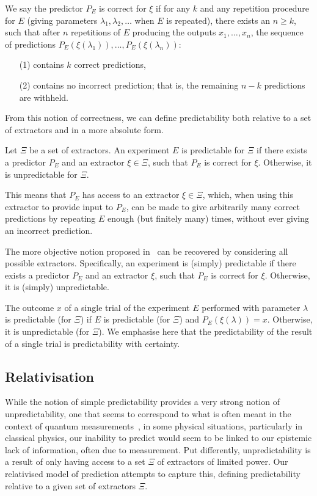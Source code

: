 \documentclass[information,article,accept,moreauthors,pdftex,12pt,a4paper]{mdpi}
\theoremstyle{mdpi}
\newcounter{ex}
\newcounter{re}
\theoremstyle{mdpidefinition}
\begin{document}
We say the predictor $P_E$ is correct for $\xi$ if for any $k$ and any repetition procedure for $E$ (giving parameters $\lambda_1, \lambda_2, \dots$ when $E$ is repeated), there exists an $n\ge k$, such that after $n$ repetitions of $E$ producing the outputs $x_1,\dots,x_n$, the sequence of predictions $P_E(\xi(\lambda_1)),\dots,P_E(\xi(\lambda_n))$:
\begin{enumerate}
	\item[(1)] contains $k$ correct predictions,
	\item[(2)] contains no incorrect prediction; that is, the remaining $n-k$ predictions are withheld.
\end{enumerate}


From this notion of correctness, we can define predictability both relative to a set of extractors and in a more absolute form.

Let $\Xi$ be a set of extractors.
An experiment $E$ is {predictable for $\Xi$} if there exists a predictor $P_E$ and an extractor $\xi\in\Xi$, such that $P_E$ is correct for $\xi$.
Otherwise, it is {unpredictable for $\Xi$}.

This means that $P_E$ has access to an extractor $\xi\in\Xi$, which, when using this extractor to provide input to $P_E$, can be made to give arbitrarily many correct predictions by repeating $E$ enough (but finitely many) times, without ever giving an incorrect prediction.

The more objective notion proposed in~\cite{DBLP:conf/birthday/AbbottCS15} can be recovered by considering all possible extractors.
Specifically, an experiment is {(simply) predictable} if there exists a predictor $P_E$ and an extractor $\xi$, such that $P_E$ is correct for $\xi$.
Otherwise, it is (simply) unpredictable.

The outcome $x$ of a {single trial} of the experiment $E$ performed with parameter $\lambda$ is {predictable \linebreak(for $\Xi$)} if $E$ is predictable (for $\Xi$) and $P_E(\xi(\lambda))=x$.
Otherwise, it is unpredictable (for $\Xi$). \linebreak
We emphasise here that the predictability of the result of a single trial is predictability {with certainty}.


\subsection{Relativisation}

While the notion of simple predictability provides a very strong notion of unpredictability, one that seems to correspond to what is often meant in the context of quantum measurements~\cite{DBLP:conf/birthday/AbbottCS15}, in some physical situations, particularly in classical physics, our inability to predict would seem to be linked to our epistemic lack of information, often due to measurement.
Put differently, unpredictability is a result of only having access to a set $\Xi$ of extractors of limited power.
Our relativised model of prediction attempts to capture this, defining predictability relative to a given set of extractors $\Xi$.
\end{document}
